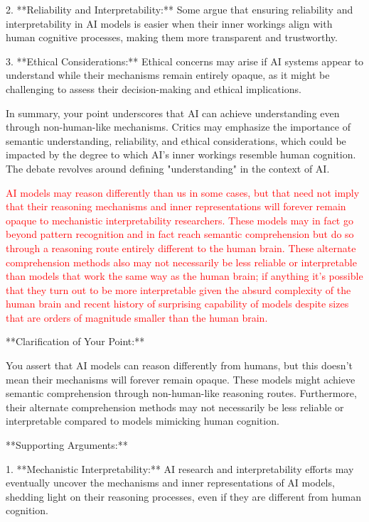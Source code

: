 \documentclass{article}
\begin{document}
2. **Reliability and Interpretability:** Some argue that ensuring reliability and interpretability in AI models is easier when their inner workings align with human cognitive processes, making them more transparent and trustworthy.

3. **Ethical Considerations:** Ethical concerns may arise if AI systems appear to understand while their mechanisms remain entirely opaque, as it might be challenging to assess their decision-making and ethical implications.

In summary, your point underscores that AI can achieve understanding even through non-human-like mechanisms. Critics may emphasize the importance of semantic understanding, reliability, and ethical considerations, which could be impacted by the degree to which AI's inner workings resemble human cognition. The debate revolves around defining "understanding" in the context of AI.

\textcolor{red}{AI models may reason differently than us in some cases, but that need not imply that their reasoning mechanisms and inner representations will forever remain opaque to mechanistic interpretability researchers. These models may in fact go beyond pattern recognition and in fact reach semantic comprehension but do so through a reasoning route entirely different to the human brain. These alternate comprehension methods also may not necessarily be less reliable or interpretable than models that work the same way as the human brain; if anything it's possible that they turn out to be more interpretable given the absurd complexity of the human brain and recent history of surprising capability of models despite sizes that are orders of magnitude smaller than the human brain.}

**Clarification of Your Point:**

You assert that AI models can reason differently from humans, but this doesn't mean their mechanisms will forever remain opaque. These models might achieve semantic comprehension through non-human-like reasoning routes. Furthermore, their alternate comprehension methods may not necessarily be less reliable or interpretable compared to models mimicking human cognition.

**Supporting Arguments:**

1. **Mechanistic Interpretability:** AI research and interpretability efforts may eventually uncover the mechanisms and inner representations of AI models, shedding light on their reasoning processes, even if they are different from human cognition.
\end{document}
